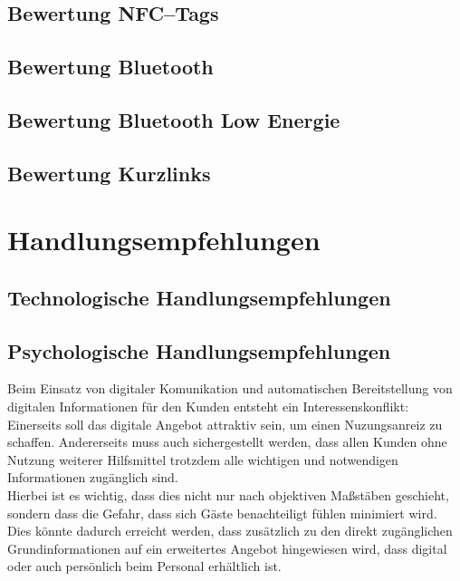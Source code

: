 \subsection{Bewertung NFC–Tags} %
\label{sub:bewertung_nfc_tags}



\subsection{Bewertung Bluetooth} %
\label{sub:bewertung_bluetooth}


\subsection{Bewertung Bluetooth Low Energie} %
\label{sub:bewertung_bluetooth_low_energie}


\subsection{Bewertung Kurzlinks} %
\label{sub:bewertung_kurzlinks}



\newpage
\section{Handlungsempfehlungen} %
\label{sec:handlungsempfehlungen}

\subsection{Technologische Handlungsempfehlungen} %
\label{sub:technologische_handlungsempfehlungen}


\subsection{Psychologische Handlungsempfehlungen} %
\label{sub:psychologische_handlungsempfehlungen}
Beim Einsatz von digitaler Komunikation und automatischen Bereitstellung von digitalen Informationen für den Kunden entsteht ein Interessenskonflikt: Einerseits soll das digitale Angebot attraktiv sein, um einen Nuzungsanreiz zu schaffen. Andererseits muss auch sichergestellt werden, dass allen Kunden ohne Nutzung weiterer Hilfsmittel trotzdem alle wichtigen und notwendigen Informationen zugänglich sind.\\
Hierbei ist es wichtig, dass dies nicht nur nach objektiven Maßstäben geschieht, sondern dass die Gefahr, dass sich Gäste benachteiligt fühlen minimiert wird. Dies könnte dadurch erreicht werden, dass zusätzlich zu den direkt zugänglichen Grundinformationen auf ein erweitertes Angebot hingewiesen wird, dass digital oder auch persönlich beim Personal erhältlich ist.

